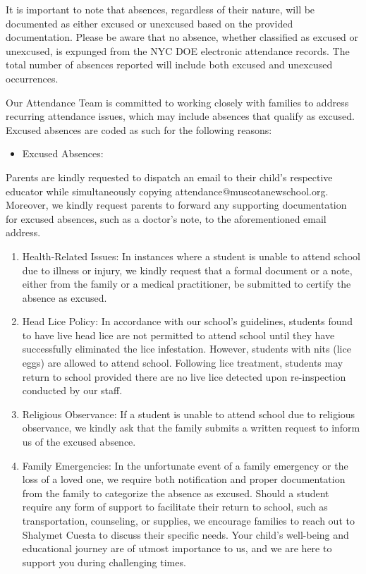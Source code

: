 \documentclass[letterpaper, 11pt]{article}
\begin{document}
It is important to note that absences, regardless of their nature, will be documented as either excused or unexcused based on the provided documentation. Please be aware that no absence, whether classified as excused or unexcused, is expunged from the NYC DOE electronic attendance records. The total number of absences reported will include both excused and unexcused occurrences.

Our Attendance Team is committed to working closely with families to address recurring attendance issues, which may include absences that qualify as excused. Excused absences are coded as such for the following reasons:
\begin{itemize}
\item Excused Absences:
\end{itemize}
Parents are kindly requested to dispatch an email to their child’s respective educator
while simultaneously copying attendance@muscotanewschool.org. Moreover, we kindly request parents to forward any supporting documentation for excused absences, such as a doctor’s note, to the aforementioned email address.
\begin{enumerate}
\item Health-Related Issues: In instances where a student is unable to attend school due to illness or injury, we kindly request that a formal document or a note, either from the family or a medical practitioner, be submitted to certify the absence as excused.
\item Head Lice Policy: In accordance with our school’s guidelines, students found to have live head lice are not permitted to attend school until they have successfully eliminated the lice infestation. However, students with nits (lice eggs) are allowed to attend school. Following lice treatment, students may return to school provided there are no live lice detected upon re-inspection conducted by our staff.
\item Religious Observance: If a student is unable to attend school due to religious observance, we kindly ask that the family submits a written request to inform us of the excused absence.
\item Family Emergencies: In the unfortunate event of a family emergency or the loss of a loved one, we require both notification and proper documentation from the family to categorize the absence as excused. Should a student require any form of support to facilitate their return to school, such as transportation, counseling, or supplies, we encourage families to reach out to Shalymet Cuesta to discuss their specific needs. Your child’s well-being and educational journey are of utmost importance to us, and we are here to support you during challenging times.
\end{enumerate}
\end{document}
